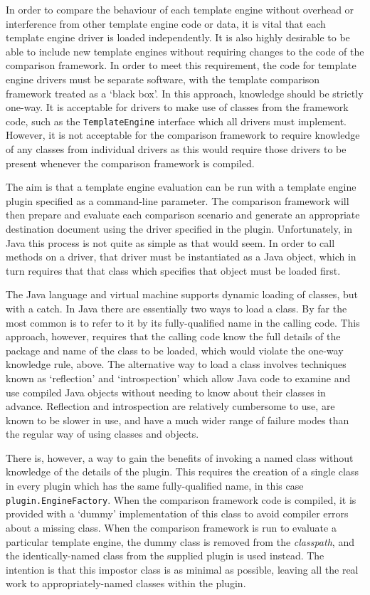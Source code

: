 In order to compare the behaviour of each template engine without overhead or interference from other template engine code or data, it is vital that each template engine driver is loaded independently. It is also highly desirable to be able to include new template engines without requiring changes to the code of the comparison framework. In order to meet this requirement, the code for template engine drivers must be separate software, with the template comparison framework treated as a `black box'. In this approach, knowledge should be strictly one-way. It is acceptable for drivers to make use of classes from the framework code, such as the \verb!TemplateEngine! interface which all drivers must implement. However, it is not acceptable for the comparison framework to require knowledge of any classes from individual drivers as this would require those drivers to be present whenever the comparison framework is compiled.

The aim is that a template engine evaluation can be run with a template engine plugin specified as a command-line parameter. The comparison framework will then prepare and evaluate each comparison scenario and generate an appropriate destination document using the driver specified in the plugin. Unfortunately, in Java this process is not quite as simple as that would seem. In order to call methods on a driver, that driver must be instantiated as a Java object, which in turn requires that that class which specifies that object must be loaded first.

The Java language and virtual machine supports dynamic loading of classes, but with a catch. In Java there are essentially two ways to load a class. By far the most common is to refer to it by its fully-qualified name in the calling code. This approach, however, requires that the calling code know the full details of the package and name of the class to be loaded, which would violate the one-way knowledge rule, above. The alternative way to load a class involves techniques known as `reflection' and `introspection' which allow Java code to examine and use compiled Java objects without needing to know about their classes in advance. Reflection and introspection are relatively cumbersome to use, are known to be slower in use, and have a much wider range of failure modes than the regular way of using classes and objects.

There is, however, a way to gain the benefits of invoking a named class without knowledge of the details of the plugin. This requires the creation of a single class in every plugin which has the same fully-qualified name, in this case \verb!plugin.EngineFactory!. When the comparison framework code is compiled, it is provided with a `dummy' implementation of this class to avoid compiler errors about a missing class. When the comparison framework is run to evaluate a particular template engine, the dummy class is removed from the \emph{classpath}, and the identically-named class from the supplied plugin is used instead. The intention is that this impostor class is as minimal as possible, leaving all the real work to appropriately-named classes within the plugin. 

